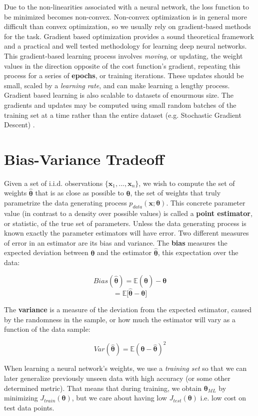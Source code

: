 Due to the non-linearities associated with a neural network, the loss function to be minimized becomes non-convex.
Non-convex optimization is in general more difficult than convex optimization, so we usually rely on gradient-based methods for the task.
Gradient based optimization provides a sound theoretical framework and a practical and well tested methodology for learning
deep neural networks. This gradient-based learning process involves \textit{moving},
or updating, the weight values in the direction opposite of the cost function's gradient, repeating this process for a series of
\textbf{epochs}, or training iterations.
These updates should be small, scaled by a
\textit{learning rate}, and can make learning a lengthy process. Gradient based learning is also scalable to datasets of enourmous size.
The gradients and updates may be computed using small random batches of the training set at a time rather than the entire dataset (e.g. Stochastic Gradient Descent) \cite{bottou2010large}.

\section{Bias-Variance Tradeoff}

Given a set of i.i.d. observations $\{\bm{x}_1, ... , \bm{x}_n\}$, we wish to compute the set of weights $\bm{\hat{\theta}}$ that is as close
as possible to $\bm{\theta}$, the set of weights that truly parametrize the data generating process $p_{data}(\bm{x};\bm{\theta})$.
This concrete parameter value (in contrast to a density over possible values) is called a \textbf{point estimator}, or statistic, of the true
set of parameters.
Unless the data generating process is known exactly the parameter estimators will have error.
Two different measures of error in an estimator are its bias and variance.
The \textbf{bias} measures the expected deviation between $\bm{\theta}$ and the estimator $\bm{\hat{\theta}}$,
this expectation over the data:

\[Bias(\bm{\hat{\theta}}) = \mathbb{E}{(\bm{\hat{\theta}})} - \bm{\theta}\]
\[ = \mathbb{E}{[\bm{\hat{\theta}} - \bm{\theta}}]\]

The \textbf{variance} is a measure of the deviation from the expected estimator, caused by
the randomness in the sample, or how much the estimator will vary as a function of the data sample:

\[ Var(\bm{\hat{\theta}}) = \mathbb{E}{(\bm{\theta} - \bm{\hat{\theta}})^{2}}\]

When learning a neural network's weights, we use a \textit{training set} so that we can later generalize
previously unseen data with high accuracy (or some other determined metric). That means that during training, we
obtain $\bm{\theta}_{ML}$ by minimizing $J_{train}(\bm{\theta})$, but we care about having low $J_{test}(\bm{\theta})$ i.e. low cost
on test data points.

